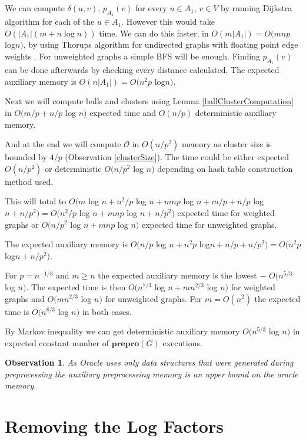 \documentclass[shortabstract, lic, english]{iithesis}
\theoremstyle{definition} \newtheorem{definition}{Definition}[chapter]
\theoremstyle{plain} \newtheorem{remark}[definition]{Observation}
\theoremstyle{plain} \newtheorem{theorem}[definition]{Theorem}
\theoremstyle{plain} \newtheorem{lemma}[definition]{Lemma}
\theoremstyle{plain} \newtheorem{conjecture}[definition]{Conjecture}
\begin{document}
We can compute $\delta(u,v)$, $p_{A_1}(v)$ for every $u \in A_1$, $v \in V$ by running Dijkstra algorithm for each of the $u \in A_1$.
However this would take $O(|A_1| (m + n\log n))$ time.
We can do this faster, in $O(m|A_1|) = O(mnp$ log$ n)$, by using Thorups algorithm for undirected graphs with floating point edge weights \cite{uberDijkstraInt, uberDijkstraFloat}.
For unweighted graphs a simple BFS will be enough.
Finding $p_{A_1}(v)$ can be done afterwards by checking every distance calculated.
The expected auxiliary memory is $O(n|A_1|) = O(n^2p$ log$ n)$.

Next we will compute balls and clusters using Lemma \ref{ballClusterComputation} in $O(m/p + n/p $ log $ n)$ expected time and $O(n/p)$ deterministic auxiliary memory.

And at the end we will compute $\mathcal{O}$ in $O(n/p^2)$ memory as cluster size is bounded by $4/p$ (Observation \ref{clusterSize}).
The time could be either expected $O(n/p^2)$ or deterministic $O(n/p^2 $ log $ n)$ depending on hash table construction method used.

This will total to $O(m $ log $ n + n^2/p $ log $ n + mnp$ log $ n + m/p + n/p $ log $ n + n/p^2) = O(n^2/p $ log $ n + mnp$ log $ n + n/p^2)$ expected time for weighted graphs
or $O(n/p^2 $ log $n + mnp $ log $n)$ expected time for unweighted graphs.

The expected auxiliary memory is $O(n/p $ log $ n + n^2p$ log$ n + n/p + n/p^2) = O(n^2p$ log$ n + n/p^2)$.

For $p = n^{-1/3}$ and $m \geq n$ the expected auxiliary memory is the lowest $-$ $O(n^{5/3} $ log $ n)$.
The expected time is then $O(n^{7/3} $ log $ n + mn^{2/3}$ log $ n)$ for weighted graphs and
$O(mn^{2/3}$ log $ n)$ for unweighted graphs. For $m = O(n^2)$ the expected time is $O(n^{8/3} $ log $n)$ in both cases.

By Markov inequality we can get deterministic auxiliary memory $O(n^{5/3} $ log $ n)$ in expected constant number of $\mathbf{prepro}(G)$ executions.

\begin{remark}
As Oracle uses only data structures that were generated during preprocessing the auxiliary preprocessing memory is an upper bound on the oracle memory.
\end{remark}



\chapter{Removing the Log Factors} \label{21TheoreticalComparison}
\end{document}
